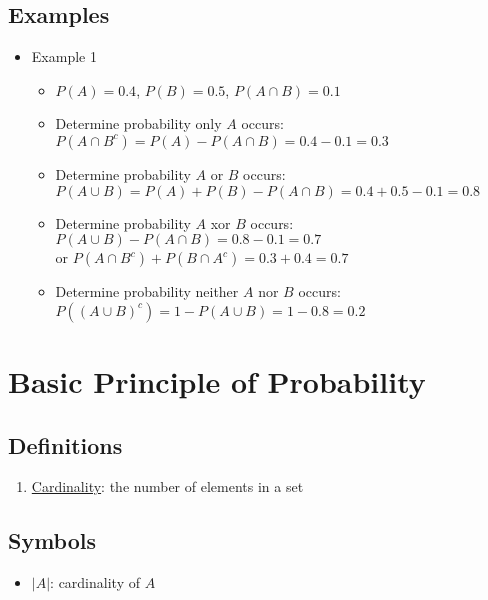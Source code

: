 \documentclass[12pt]{article}
\begin{document}
        \subsection{Examples}
            \begin{itemize}
                \item Example 1
                \begin{itemize}
                    \item $P(A) = 0.4$, $P (B) = 0.5$, $P (A \cap{} B) = 0.1$
                    \item Determine probability only $A$ occurs:
                    \\$P (A \cap{} B^c) = P (A) - P (A \cap{} B) = 0.4 - 0.1 = 0.3$
                    \item Determine probability $A$ or $B$ occurs:
                    \\$P (A \cup{} B) = P (A) + P(B) - P(A \cap{} B) = 0.4 + 0.5 - 0.1 = 0.8$
                    \item Determine probability $A$ xor $B$ occurs:
                    \\$P (A \cup{} B) - P (A \cap{} B) = 0.8 - 0.1 = 0.7$
                    \\or $P (A \cap{} B^c) + P (B \cap{} A^c) = 0.3 + 0.4 = 0.7$
                    \item Determine probability neither $A$ nor $B$ occurs:
                    \\$P ({(A \cup{} B)}^c) = 1 - P (A \cup{} B) = 1 - 0.8 = 0.2$
                \end{itemize}
            \end{itemize}
    \section{Basic Principle of Probability}
        \subsection{Definitions}
            \begin{enumerate}
                \item \underline{Cardinality}: the number of elements in a set
            \end{enumerate}
        \subsection{Symbols}
            \begin{itemize}
                \item $|A|$: cardinality of $A$
            \end{itemize}
\end{document}

